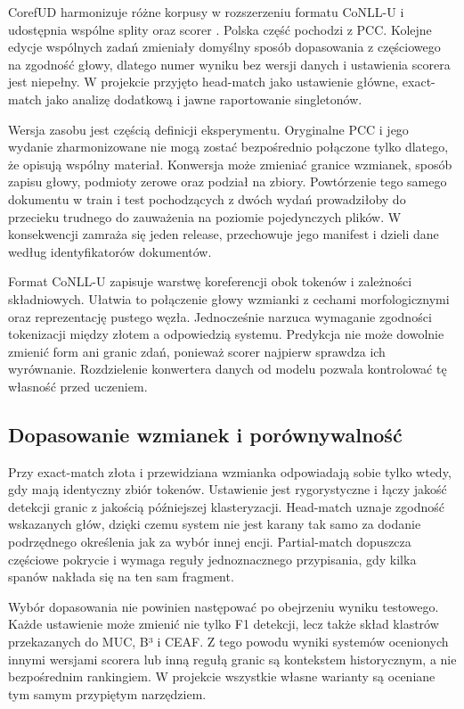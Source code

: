 CorefUD harmonizuje różne korpusy w rozszerzeniu formatu CoNLL-U i udostępnia wspólne splity oraz scorer \cite{nedoluzhko_2022_corefud}. Polska część pochodzi z PCC. Kolejne edycje wspólnych zadań zmieniały domyślny sposób dopasowania z częściowego na zgodność głowy, dlatego numer wyniku bez wersji danych i ustawienia scorera jest niepełny. W projekcie przyjęto head-match jako ustawienie główne, exact-match jako analizę dodatkową i jawne raportowanie singletonów.

Wersja zasobu jest częścią definicji eksperymentu. Oryginalne PCC i jego wydanie zharmonizowane nie mogą zostać bezpośrednio połączone tylko dlatego, że opisują wspólny materiał. Konwersja może zmieniać granice wzmianek, sposób zapisu głowy, podmioty zerowe oraz podział na zbiory. Powtórzenie tego samego dokumentu w train i test pochodzących z dwóch wydań prowadziłoby do przecieku trudnego do zauważenia na poziomie pojedynczych plików. W konsekwencji zamraża się jeden release, przechowuje jego manifest i dzieli dane według identyfikatorów dokumentów.

Format CoNLL-U zapisuje warstwę koreferencji obok tokenów i zależności składniowych. Ułatwia to połączenie głowy wzmianki z cechami morfologicznymi oraz reprezentację pustego węzła. Jednocześnie narzuca wymaganie zgodności tokenizacji między złotem a odpowiedzią systemu. Predykcja nie może dowolnie zmienić form ani granic zdań, ponieważ scorer najpierw sprawdza ich wyrównanie. Rozdzielenie konwertera danych od modelu pozwala kontrolować tę własność przed uczeniem.

\subsection{Dopasowanie wzmianek i porównywalność}

Przy exact-match złota i przewidziana wzmianka odpowiadają sobie tylko wtedy, gdy mają identyczny zbiór tokenów. Ustawienie jest rygorystyczne i łączy jakość detekcji granic z jakością późniejszej klasteryzacji. Head-match uznaje zgodność wskazanych głów, dzięki czemu system nie jest karany tak samo za dodanie podrzędnego określenia jak za wybór innej encji. Partial-match dopuszcza częściowe pokrycie i wymaga reguły jednoznacznego przypisania, gdy kilka spanów nakłada się na ten sam fragment.

Wybór dopasowania nie powinien następować po obejrzeniu wyniku testowego. Każde ustawienie może zmienić nie tylko F1 detekcji, lecz także skład klastrów przekazanych do MUC, B³ i CEAF. Z tego powodu wyniki systemów ocenionych innymi wersjami scorera lub inną regułą granic są kontekstem historycznym, a nie bezpośrednim rankingiem. W projekcie wszystkie własne warianty są oceniane tym samym przypiętym narzędziem.

